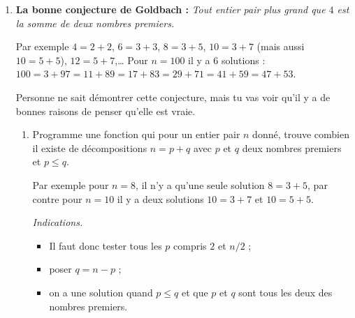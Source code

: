 \documentclass[11pt,class=report,crop=false]{standalone}
\begin{document}






\begin{activite}


\begin{enumerate}
  \item \textbf{La bonne conjecture de Goldbach :} \emph{Tout entier pair plus grand que $4$ est la somme de deux nombres premiers.}

  Par exemple $4 = 2+2$, $6=3+3$, $8=3+5$, $10=3+7$ (mais aussi $10=5+5$), $12 = 5+7$,\ldots{}
  Pour $n=100$ il y a $6$ solutions : $100=3+97=11+89=17+83=29+71=41+59=47+53$.
  
  Personne ne sait démontrer cette conjecture, mais tu vas voir qu'il y a de bonnes raisons de penser qu'elle est vraie.
  
  \begin{enumerate}
    \item Programme une fonction  qui pour un entier pair $n$ donné, trouve combien il existe de décompositions $n=p+q$ avec $p$ et $q$ deux nombres premiers et $p\le q$.
    
    Par exemple pour $n=8$, il n'y a qu'une seule solution $8=3+5$, par contre pour $n=10$ il y a deux solutions $10 =  3+7$ et $10=5+5$.
 
   \emph{Indications.} 
   \begin{itemize}
     \item Il faut donc tester tous les $p$ compris $2$ et $n/2$ ;
     \item poser $q = n - p$ ;
     \item on a une solution quand $p \le q$ et que $p$ et $q$ sont tous les deux des nombres premiers.
   \end{itemize}
   

\end{enumerate}
\end{enumerate}
\end{activite}
\end{document}

